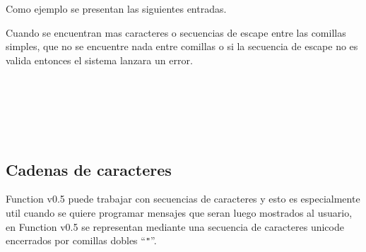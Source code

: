       Como ejemplo se presentan las siguientes entradas.
      
      \begin{fxcode}
          
      \end{fxcode}
      
      \begin{fxcode}
         \arrowcode{\textquotesingle\textbackslash\textquotesingle\textquotesingle} 
      \end{fxcode}
      
      \begin{fxcode}
          
      \end{fxcode}
      
      \begin{fxcode}
          
      \end{fxcode}
      
      Cuando se encuentran mas caracteres o secuencias de escape entre las comillas simples, que no se encuentre nada entre comillas o si la secuencia de escape no es valida entonces el sistema lanzara un error.
      
      \begin{fxcode}
         \\
      \end{fxcode}
      
      \begin{fxcode}
         \arrowcode{\textquotesingle\textquotesingle}\\
      \end{fxcode}
      
      \begin{fxcode}
         \\
      \end{fxcode}
      
      \subsection{Cadenas de caracteres}
      Function v0.5 puede trabajar con secuencias de caracteres y esto es especialmente util cuando se quiere programar mensajes que seran luego mostrados al usuario, en Function v0.5 se representan mediante una secuencia de caracteres unicode encerrados por comillas dobles ``\texttt{"}''.
      

